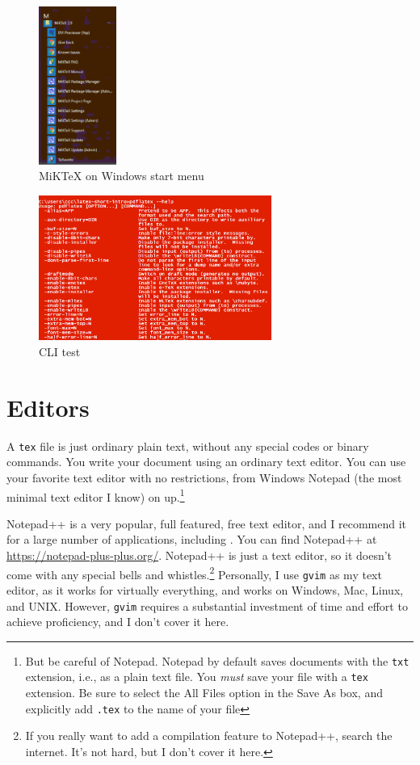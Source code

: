     \begin{figure}[!hb]
        \includegraphics[width=1in]{../images/miktex-winstart.pdf}
        \caption{MiKTeX on Windows start menu}
        \label{img:MiKTeX winstart}
    \end{figure}

    \begin{figure}[!hb]
        \includegraphics[width=3in]{../images/install-test.pdf}
        \caption{CLI test}
        \label{img:CLI test}
    \end{figure}

    \section{\LaTeXe Editors}
    \label{Editors}

    A \texttt{tex} file is just ordinary plain text, without any special codes or binary commands. You write your \Lx{} document using an ordinary text editor. You can use your favorite text editor with no restrictions, from Windows Notepad (the most minimal text editor I know) on up.\footnote{But be careful of Notepad. Notepad by default saves documents with the \texttt{txt} extension, i.e., as a plain text file. You \textit{must} save your \Lx{} file with a \texttt{tex} extension. Be sure to select the All Files option in the Save As box, and explicitly add \texttt{.tex} to the name of your file}

    Notepad++ is a very popular, full featured, free text editor, and I recommend it for a large number of applications, including \Lx{}. You can find Notepad++ at \url{https://notepad-plus-plus.org/}. Notepad++ is just a text editor, so it doesn't come with any special bells and whistles.\footnote{If you really want to add a compilation feature to Notepad++, search the internet. It's not hard, but I don't cover it here.} Personally, I use \texttt{gvim} as my text editor, as it works for virtually everything, and works on Windows, Mac, Linux, and UNIX. However, \texttt{gvim} requires a substantial investment of time and effort to achieve proficiency, and I don't cover it here.

